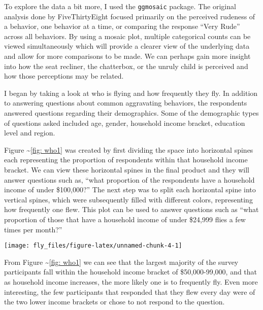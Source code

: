 To explore the data a bit more, I used the \texttt{ggmosaic} package.
The original analysis done by FiveThirtyEight focused primarily on the
perceived rudeness of a behavior, one behavior at a time, or comparing
the response ``Very Rude'' across all behaviors. By using a mosaic plot,
multiple categorical counts can be viewed simultaneously which will
provide a clearer view of the underlying data and allow for more
comparisons to be made. We can perhaps gain more insight into how the
seat recliner, the chatterbox, or the unruly child is perceived and how
those perceptions may be related.

I began by taking a look at who is flying and how frequently they fly.
In addition to answering questions about common aggravating behaviors,
the respondents answered questions regarding their demographics. Some of
the demographic types of questions asked included age, gender, household
income bracket, education level and region.

Figure \textasciitilde{}\ref{fig: who1} was created by first dividing
the space into horizontal spines each representing the proportion of
respondents within that household income bracket. We can view these
horizontal spines in the final product and they will answer questions
such as, ``what proportion of the respondents have a household income of
under \$100,000?'' The next step was to split each horizontal spine into
vertical spines, which were subsequently filled with different colors,
representing how frequently one flew. This plot can be used to answer
questions such as ``what proportion of those that have a household
income of under \$24,999 flies a few times per month?''

\begin{Schunk}


\begin{center}\texttt{[image: fly\_files/figure-latex/unnamed-chunk-4-1]} \end{center}

\end{Schunk}

From Figure \textasciitilde{}\ref{fig: who1} we can see that the largest
majority of the survey participants fall within the household income
bracket of \$50,000-99,000, and that as household income increases, the
more likely one is to frequently fly. Even more interesting, the few
participants that responded that they flew every day were of the two
lower income brackets or chose to not respond to the question.

